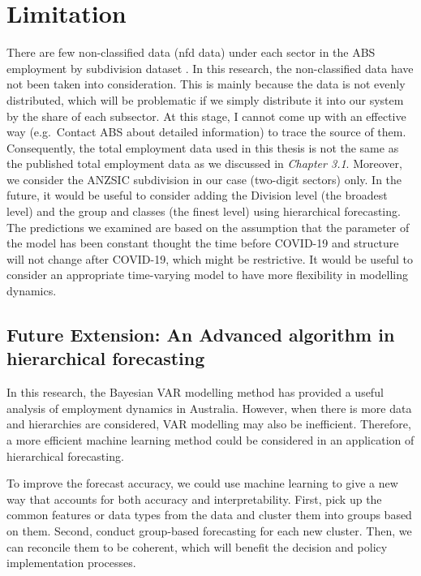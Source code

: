 \documentclass{monashthesis}
\begin{document}
\hypertarget{limitation}{%
\section{Limitation}\label{limitation}}

There are few non-classified data (nfd data) under each sector in the ABS employment by subdivision dataset \autocite{ABS2022}. In this research, the non-classified data have not been taken into consideration. This is mainly because the data is not evenly distributed, which will be problematic if we simply distribute it into our system by the share of each subsector. At this stage, I cannot come up with an effective way (e.g.~Contact ABS about detailed information) to trace the source of them. Consequently, the total employment data used in this thesis is not the same as the published total employment data as we discussed in \emph{Chapter 3.1}. Moreover, we consider the ANZSIC subdivision in our case (two-digit sectors) only. In the future, it would be useful to consider adding the Division level (the broadest level) and the group and classes (the finest level) using hierarchical forecasting. The predictions we examined are based on the assumption that the parameter of the model has been constant thought the time before COVID-19 and structure will not change after COVID-19, which might be restrictive. It would be useful to consider an appropriate time-varying model to have more flexibility in modelling dynamics.

\hypertarget{future-extension-an-advanced-algorithm-in-hierarchical-forecasting}{%
\subsection{Future Extension: An Advanced algorithm in hierarchical forecasting}\label{future-extension-an-advanced-algorithm-in-hierarchical-forecasting}}

In this research, the Bayesian VAR modelling method has provided a useful analysis of employment dynamics in Australia. However, when there is more data and hierarchies are considered, VAR modelling may also be inefficient. Therefore, a more efficient machine learning method could be considered in an application of hierarchical forecasting.

To improve the forecast accuracy, we could use machine learning to give a new way that accounts for both accuracy and interpretability. First, pick up the common features or data types from the data and cluster them into groups based on them. Second, conduct group-based forecasting for each new cluster. Then, we can reconcile them to be coherent, which will benefit the decision and policy implementation processes.
\end{document}
